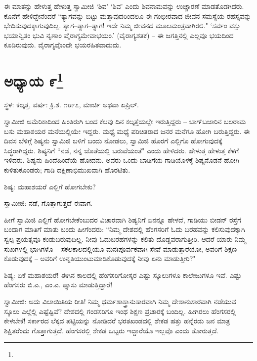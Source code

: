ಈ ಮಾತನ್ನು ಹೇಳುತ್ತ ಹೇಳುತ್ತ ಸ್ವಾಮೀಜಿ ‘ಶಿವ’ ‘ಶಿವ’ ಎಂದು ಶಿವನಾಮವನ್ನು ಉಚ್ಚಾರಣೆ ಮಾಡತೊಡಗಿದರು. ಕೊನೆಗೆ ಹೇಳಿದ್ದೇನೆಂದರೆ “ತ್ಯಾಗವನ್ನು ಬಿಟ್ಟು ಮತ್ತಾವುದರಿಂದಲೂ ಈ ಗಂಭೀರವಾದ ಜೀವನ ಸಮಸ್ಯೆಯ ರಹಸ್ಯವನ್ನು ಭೇದಿಸುವುದಕ್ಕಾಗುವುದಿಲ್ಲ. ತ್ಯಾಗ–ತ್ಯಾಗ–ತ್ಯಾಗ! ಇದೇ ನಿಮ್ಮ ಜೀವನದ ಮೂಲಮಂತ್ರವಾಗಿರಲಿ." ‘ಸರ್ವಂ ವಸ್ತು ಭಯಾನ್ವಿತಂ ಭುವಿ ನೃಣಾಂ ವೈರಾಗ್ಯಮೇವಾಭಯಂ.’ (ವೈರಾಗ್ಯಶತಕ) – ಈ ಜಗತ್ತಿನಲ್ಲಿ ಎಲ್ಲವೂ ಭಯದಿಂದ ಕೂಡಿರುವುದು. ವೈರಾಗ್ಯವೊಂದೇ ಭಯರಹಿತವಾದುದು.

\newpage

\chapter[ಅಧ್ಯಾಯ ೯]{ಅಧ್ಯಾಯ ೯\protect\footnote{}}

\centerline{ಸ್ಥಳ: ಕಲ್ಕತ್ತ, ವರ್ಷ: ಕ್ರಿ.ಶ. ೧೮೯೭, ಮಾರ್ಚಿ ಅಥವಾ ಏಪ್ರಿಲ್.}

ಸ್ವಾಮೀಜಿ ಅಮೆರಿಕಾದಿಂದ ಹಿಂತಿರುಗಿ ಬಂದ ಕೆಲವು ದಿನ ಕಲ್ಕತ್ತೆಯಲ್ಲೇ ಇರುತ್ತಿದ್ದರು – ಬಾಗ್‌ಬಜಾರಿನ ಬಲರಾಮ ಬಸು ಮಹಾಶಯರ ಮನೆಯಲ್ಲಿಯೇ ಇದ್ದರು. ಮಧ್ಯೆ ಮಧ್ಯೆ ಪರಿಚಿತರಾದ ಜನರ ಮನೆಗೂ ಹೋಗಿ ಬರುತ್ತಿದ್ದರು. ಈ ದಿವಸ ಬೆಳಿಗ್ಗೆ ಶಿಷ್ಯನು ಸ್ವಾಮಿಜಿ ಬಳಿಗೆ ಬಂದು ನೋಡಲು, ಸ್ವಾಮಿಜಿ ಹೊರಗೆ ಎಲ್ಲಿಗೊ ಹೋಗುವುದಕ್ಕೆ ಸಿದ್ಧರಾಗಿದ್ದರು. ಶಿಷ್ಯನಿಗೆ “ನಡೆ, ನನ್ನ ಜೊತೆಯಲ್ಲಿ ಬರುವೆಯಂತೆ" ಎಂದು ಹೇಳಿದರು. ಹೇಳುತ್ತ ಹೇಳುತ್ತ ಕೆಳಗೆ ಇಳಿದರು. ಶಿಷ್ಯನು ಹಿಂದೆಹಿಂದೆಯೆ ಹೋದನು. ಅವರು ಒಂದು ಬಾಡಿಗೆಯ ಗಾಡಿಯೊಳಕ್ಕೆ ಶಿಷ್ಯನೊಡನೆ ಹೋಗಿ ಕುಳಿತುಕೊಂಡರು; ಗಾಡಿ ದಕ್ಷಿಣಾಭಿಮುಖವಾಗಿ ಹೊರಟಿತು.

ಶಿಷ್ಯ: ಮಹಾಶಯರೆ ಎಲ್ಲಿಗೆ ಹೋಗಬೇಕು?

ಸ್ವಾಮೀಜಿ: ನಡೆ, ಗೊತ್ತಾಗುತ್ತದೆ ಈವಾಗ.

ಹೀಗೆ ಸ್ವಾಮಿಜಿ ಎಲ್ಲಿಗೆ ಹೋಗಬೇಕೆಂಬುದರ ವಿಚಾರವಾಗಿ ಶಿಷ್ಯನಿಗೆ ಏನನ್ನೂ ಹೇಳದೆ, ಗಾಡಿಯು ಬೀಡನ್ ರಸ್ತೆಗೆ ಬಂದಾಗ ಮಾತಿಗೆ ಮಾತು ಬಂದು ಹೀಗೆಂದರು: “ನಿಮ್ಮ ದೇಶದಲ್ಲಿ ಹೆಂಗಸರಿಗೆ ಓದು ಬರಹವನ್ನು ಕಲಿಸುವುದಕ್ಕಾಗಿ ಸ್ವಲ್ಪ ಪ್ರಯತ್ನವೂ ಕಂಡುಬರುವುದಿಲ್ಲ. ನೀವು ಓದುಬರಹಗಳನ್ನು ಕಲಿತು ದೊಡ್ಡವರಾಗುತ್ತೀರಿ. ಆದರೆ ಯಾರು ನಿಮ್ಮ ಸುಖಗಳಲ್ಲಿ ಭಾಗಿಗಳೊ – ಸಕಲಕಾಲದಲ್ಲಿಯೂ ಮನಃಪೂರ್ವಕವಾಗಿ ಸೇವೆ ಮಾಡುತ್ತಾರೆಯೋ, ಅವರಿಗೆ ಶಿಕ್ಷಣ ಕೊಡುವುದಕ್ಕೆ – ಅವರಿಗೆ ಉನ್ನತಿಯುಂಟುಮಾಡಿಕೊಡುವುದಕ್ಕೆ ನೀವು ಏನು ಮಾಡುತ್ತೀರಿ?"

ಶಿಷ್ಯ: ಏಕೆ ಮಹಾಶಯರೆ! ಈಗಿನ ಕಾಲದಲ್ಲಿ ಹೆಂಗಸರಿಗೋಸ್ಕರ ಎಷ್ಟು ಸ್ಕೂಲುಗಳೂ ಕಾಲೇಜುಗಳೂ ಇವೆ. ಎಷ್ಟು ಹೆಂಗಸರು ಬಿ.ಎ., ಎಂ.ಎ. ಪ್ಯಾಸು ಮಾಡುತ್ತಿದ್ದಾರೆ!

ಸ್ವಾಮೀಜಿ: ಅದು ವಿಲಾಯಿತಿಯ ರೀತಿ! ನಿಮ್ಮ ಧರ್ಮಶಾಸ್ತ್ರಾನುಸಾರವಾಗಿ ನಿಮ್ಮ ದೇಶಾನುಸಾರವಾಗಿ ನಡೆಯುವ ಸ್ಕೂಲು ಎಲ್ಲೆಲ್ಲಿ ಎಷ್ಟೆಷ್ಟಿವೆ? ದೇಶದಲ್ಲಿ ಗಂಡಸರಿಗೂ ಇಂಥ ಶಿಕ್ಷಣ ಪ್ರಚಾರಕ್ಕೆ ಬಂದಿಲ್ಲ. ಹೀಗಿರಲು ಹೆಂಗಸರಲ್ಲಿ ಕೇಳಬೇಕೆ! ಸರ್ಕಾರದ ಲೆಕ್ಕದ ಪಟ್ಟಿಯನ್ನು ನೋಡಿದರೆ ಭರತಖಂಡದಲ್ಲಿ ಶೇಕಡ ಹತ್ತು ಹನ್ನೆರಡು ಜನ ಮಾತ್ರ ಶಿಕ್ಷಿತರೆಂದು ಗೊತ್ತಾಗುತ್ತದೆ. ಹೆಂಗಸರಲ್ಲಿ ಶೇಕಡ ಒಬ್ಬರು ಇದ್ದಾರೆಯೊ ಇಲ್ಲವೊ ಎಂದು ತೋರುತ್ತದೆ.

